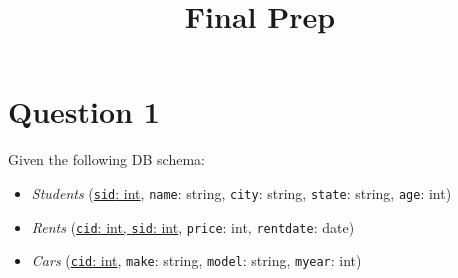 \documentclass[letterpaper, 11pt]{article}
\title{Final Prep}
\author{}
\date{}
\begin{document}
\maketitle

\vspace{-4em}

\section*{Question 1}

Given the following DB schema:
\begin{itemize}
    \item \textit{Students} (\ul{\texttt{sid}: int}, \texttt{name}: string, \texttt{city}: string, \texttt{state}: string, \texttt{age}: int)
    \item \textit{Rents} (\ul{\texttt{cid}: int, \texttt{sid}: int}, \texttt{price}: int, \texttt{rentdate}: date)
    \item \textit{Cars} (\ul{\texttt{cid}: int}, \texttt{make}: string, \texttt{model}: string, \texttt{myear}: int)
\end{itemize}
\end{document}

